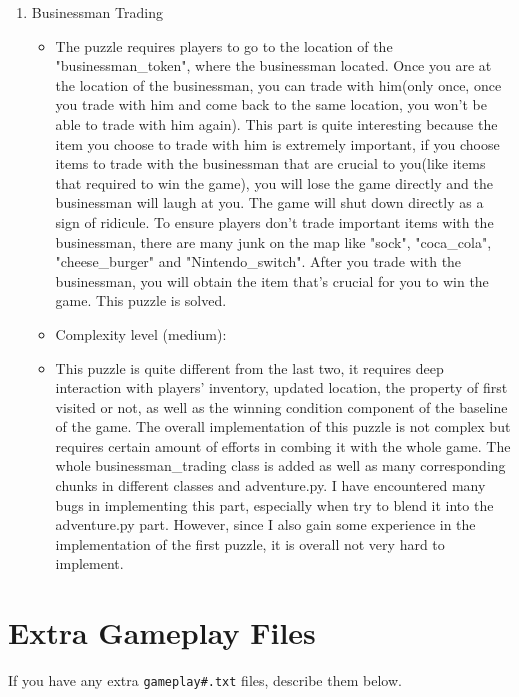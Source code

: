 \documentclass[11pt]{article}
\begin{document}
\begin{enumerate}
\item Businessman Trading
	\begin{itemize}
	\item The puzzle requires players to go to the location of the "businessman_token", where the businessman located. Once you are at the location of the businessman, you can trade with him(only once, once you trade with him and come back to the same location, you won't be able to trade with him again). This part is quite interesting because the item you choose to trade with him is extremely important, if you choose items to trade with the businessman that are crucial to you(like items that required to win the game), you will lose the game directly and the businessman will laugh at you. The game will shut down directly as a sign of ridicule. To ensure players don't trade important items with the businessman, there are many junk on the map like "sock", "coca_cola", "cheese_burger" and "Nintendo_switch". After you trade with the businessman, you will obtain the item that's crucial for you to win the game. This puzzle is solved.
	\item Complexity level (medium):
	\item This puzzle is quite different from the last two, it requires deep interaction with players' inventory, updated location, the property of first visited or not, as well as the winning condition component of the baseline of the game. The overall implementation of this puzzle is not complex but requires certain amount of efforts in combing it with the whole game. The whole businessman_trading class is added as well as many corresponding chunks in different classes and adventure.py. I have encountered many bugs in implementing this part, especially when try to blend it into the adventure.py part. However, since I also gain some experience in the implementation of the first puzzle, it is overall not very hard to implement.
	\end{itemize}

\end{enumerate}


\section*{Extra Gameplay Files}

If you have any extra \texttt{gameplay\#.txt} files, describe them below.
\end{document}
